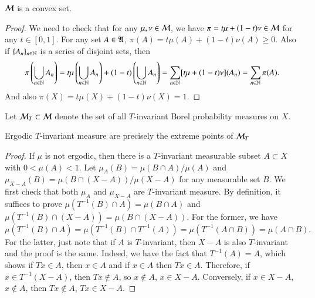 \documentclass[12pt,a4paper]{article}
\begin{document}
	\begin{proposition}{}{}
		$\mathcal{M}$ is a convex set.
	\end{proposition}
	\begin{proof}
		We need to check that for any $\mu,\nu\in\mathcal{M}$, we have $\pi=t\mu+(1-t)\nu\in \mathcal{M}$ for any $t\in [0,1]$. For any set $A\in \mathfrak{A}$, $\pi(A)=t\mu(A)+(1-t)\nu(A)\geq 0$. Also if $\{A_n\}_{n\in\mathbb{N}}$ is a series of disjoint sets, then
		$$
		\pi\left(\bigcup_{n\in\mathbb{N}}A_n\right)=t\mu\left(\bigcup_{n\in\mathbb{N}}A_n\right)+(1-t)\left(\bigcup_{n\in\mathbb{N}}A_n\right)=\sum_{n\in \mathbb{N}}[t\mu+(1-t)\nu](A_n)=\sum_{n\in \mathbb{N}}\pi(A).
		$$
		And also $\pi(X)=t\mu(X)+(1-t)\nu(X)=1$.
	\end{proof}

	Let $\mathcal{M}_T\subset \mathcal{M}$ denote the set of all $T$-invariant Borel probability measures on $X$.
	\begin{proposition}{}{}
		Ergodic $T$-invariant measure are precisely the extreme points of $\mathcal{M}_T$
	\end{proposition}
	\begin{proof}
		If $\mu$ is not ergodic, then there is a $T$-invariant measurable subset $A\subset X$ with $0<\mu(A)<1$. Let $\mu_A(B)=\mu(B\cap A)/\mu(A)$ and $\mu_{X-A}(B)=\mu(B\cap(X-A))/\mu(X-A)$ for any measurable set $B$. We first check that both $\mu_A$ and $\mu_{X-A}$ are $T$-invariant measure. By definition, it suffices to prove $\mu(T^{-1}(B)\cap A)=\mu(B\cap A)$ and $\mu(T^{-1}(B)\cap (X-A))=\mu(B\cap (X-A))$. For the former, we have
		$$
		\mu(T^{-1}(B)\cap A)=\mu(T^{-1}(B)\cap T^{-1}(A))=\mu(T^{-1}(A\cap B))=\mu(A\cap B).
		$$
		For the latter, just note that if $A$ is $T$-invariant, then $X-A$ is also $T$-invariant and the proof is the same. Indeed, we have the fact that $T^{-1}(A)=A$, which shows if $Tx\in A$, then $x\in A$ and if $x\in A$ then $Tx\in A$. Therefore, if $x\in T^{-1}(X-A)$, then $Tx\notin A$, so $x\notin A$, $x\in X-A$. Conversely, if $x\in X-A$, $x\notin A$, then $Tx\notin A$, $Tx\in X-A$.
	\end{proof}
\end{document}
